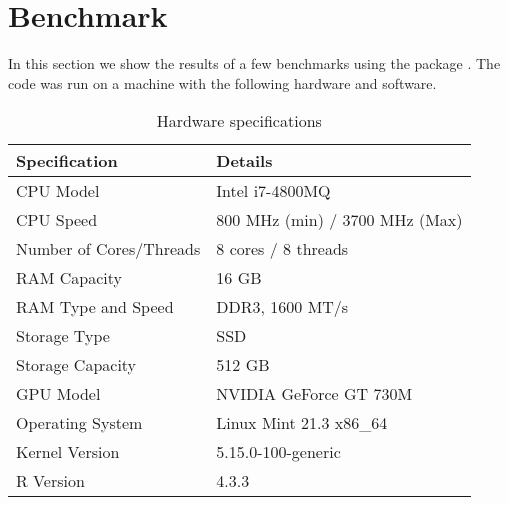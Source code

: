 \section{Benchmark}
In this section we show the results of a few benchmarks using the  package \cite{microbenchmark}. The code was run on a machine with the following hardware and software.
\begin{table}[ht]
    \centering
    \begin{tabular}{@{}ll@{}}
    \toprule
    Specification      & Details                              \\ \midrule
    CPU Model          & Intel i7-4800MQ                 \\
    CPU Speed          & 800 MHz (min) / 3700 MHz (Max)     \\
    Number of Cores/Threads & 8 cores / 8 threads              \\
    RAM Capacity       & 16 GB                                \\
    RAM Type and Speed & DDR3, 1600 MT/s                      \\
    Storage Type       & SSD                                  \\
    Storage Capacity   & 512 GB                               \\
    GPU Model          & NVIDIA GeForce GT 730M              \\
    Operating System   & Linux Mint 21.3 x86\_64                   \\
    Kernel Version     & 5.15.0-100-generic                    \\
    R Version          & 4.3.3                                \\
    \bottomrule
    \end{tabular}
    \caption{Hardware specifications}
    \label{tab:specs}
    \end{table}